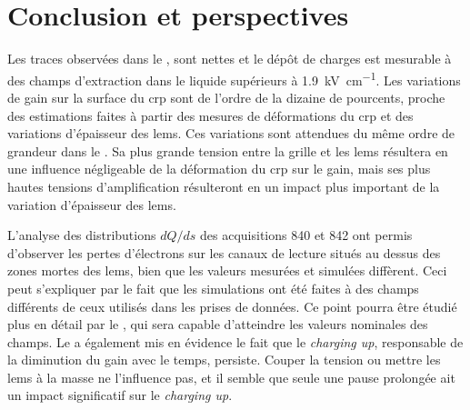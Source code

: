       \FloatBarrier

  \section{Conclusion et perspectives}

    Les traces observées dans le \TOO{}, sont nettes et le dépôt de charges est mesurable à des champs d'extraction dans le liquide supérieurs à \SI{1.9}{\kilo\volt\per\centi\meter}. Les variations de gain sur la surface du \gls{crp} sont de l'ordre de la dizaine de pourcents, proche des estimations faites à partir des mesures de déformations du \gls{crp} et des variations d'épaisseur des \glspl{lem}. Ces variations sont attendues du même ordre de grandeur dans le \SSS{}. Sa plus grande tension entre la grille et les \glspl{lem} résultera en une influence négligeable de la déformation du \gls{crp} sur le gain, mais ses plus hautes tensions d'amplification résulteront en un impact plus important de la variation d'épaisseur des \glspl{lem}.

    L'analyse des distributions $dQ/ds$ des acquisitions 840 et 842 ont permis d'observer les pertes d'électrons sur les canaux de lecture situés au dessus des zones mortes des \glspl{lem}, bien que les valeurs mesurées et simulées diffèrent. Ceci peut s'expliquer par le fait que les simulations ont été faites à des champs différents de ceux utilisés dans les prises de données. Ce point pourra être étudié plus en détail par le \SSS{}, qui sera capable d'atteindre les valeurs nominales des champs. Le \TOO{} a également mis en évidence le fait que le \textit{charging up}, responsable de la diminution du gain avec le temps, persiste. Couper la tension ou mettre les \glspl{lem} à la masse ne l'influence pas, et il semble que seule une pause prolongée ait un impact significatif sur le \textit{charging up}.

\FloatBarrier

\printbibliography